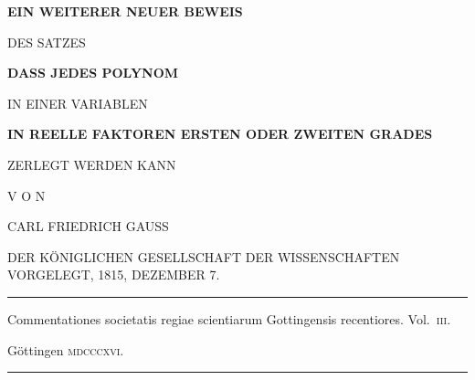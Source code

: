 \thispagestyle{empty}
\begin{center}
\vspace*{.25in}
{\large\bfseries EIN WEITERER NEUER BEWEIS}\par
\vspace{.18in}
DES SATZES\par
\vspace{.35in}
{\Large\bfseries DASS JEDES POLYNOM\par
\medskip }\par
\vspace{.25in}
IN EINER VARIABLEN\par
\vspace{.25in}
{\bfseries IN REELLE FAKTOREN ERSTEN ODER ZWEITEN GRADES}\par
\vspace{.25in}
ZERLEGT WERDEN KANN\par
\vspace{.6in}
V O N\par
\vspace{.3in}
{\large CARL FRIEDRICH GAUSS}\par
\vspace{.35in}
DER KÖNIGLICHEN GESELLSCHAFT DER WISSENSCHAFTEN VORGELEGT, 1815, DEZEMBER 7.\par
\vspace{.65in}
\rule{.88\linewidth}{.3pt}\par
\medskip
{\small Commentationes societatis regiae scientiarum Gottingensis recentiores. Vol.~\textsc{iii}.\par}
\medskip
Göttingen \textsc{mdcccxvi}.\par
\medskip
\rule{.88\linewidth}{.3pt}
\end{center}
\clearpage
